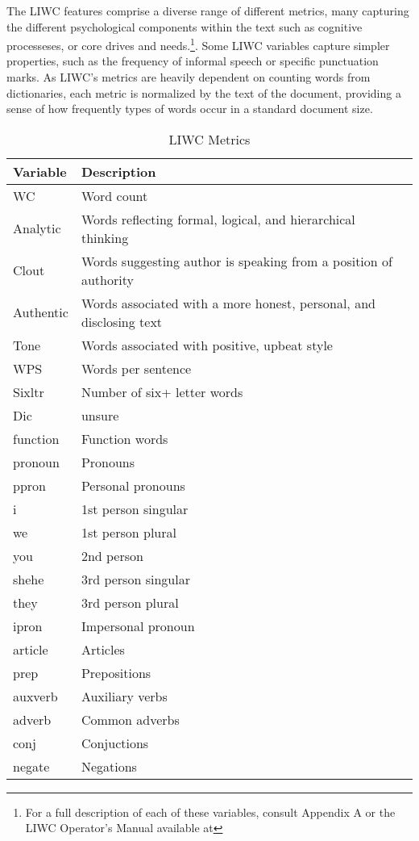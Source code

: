 \documentclass[../thesis.tex]{subfiles}
\begin{document}
The LIWC features comprise a diverse range of different metrics, many capturing the different psychological components within the text such as cognitive processeses, or core drives and needs.\footnote{For a full description of each of these variables, consult Appendix A or the LIWC Operator's Manual available at}. Some LIWC variables capture simpler properties, such as the frequency of informal speech or specific punctuation marks. As LIWC's metrics are heavily dependent on counting words from dictionaries, each metric is normalized by the text of the document, providing a sense of how frequently types of words occur in a standard document size.

\begin{longtable}[t]{ll}
\caption{\label{tab:}LIWC Metrics}\\
\toprule
Variable & Description\\
\midrule
WC & Word count\\
Analytic & Words reflecting formal, logical, and hierarchical thinking\\
Clout & Words suggesting author is speaking from a position of authority\\
Authentic & Words associated with a more honest, personal, and disclosing text\\
Tone & Words associated with positive, upbeat style\\
\addlinespace
WPS & Words per sentence\\
Sixltr & Number of six+ letter words\\
Dic & unsure\\
function & Function words\\
pronoun & Pronouns\\
\addlinespace
ppron & Personal pronouns\\
i & 1st person singular\\
we & 1st person plural\\
you & 2nd person\\
shehe & 3rd person singular\\
\addlinespace
they & 3rd person plural\\
ipron & Impersonal pronoun\\
article & Articles\\
prep & Prepositions\\
auxverb & Auxiliary verbs\\
\addlinespace
adverb & Common adverbs\\
conj & Conjuctions\\
negate & Negations\\

\end{longtable}
\end{document}
